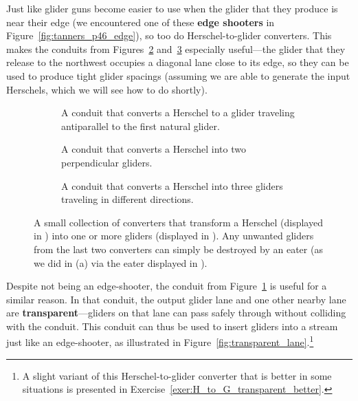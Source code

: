 Just like glider guns become easier to use when the glider that they produce is near their edge (we encountered one of these \textbf{edge shooters} in Figure~\ref{fig:tanners_p46_edge}), so too do Herschel-to-glider converters. This makes the conduits from Figures~\ref{fig:H_to_2G} and~\ref{fig:H_to_3G} especially useful---the glider that they release to the northwest occupies a diagonal lane close to its edge, so they can be used to produce tight glider spacings (assuming we are able to generate the input Herschels, which we will see how to do shortly).

\begin{figure}[!htb]
	\centering
	\begin{subfigure}{.315\textwidth}
		\centering\vspace*{1.23cm}
		\caption{A conduit that converts a Herschel to a glider traveling antiparallel to the first natural glider.}
		\label{fig:H_to_G}
	\end{subfigure} \hfill %
	\begin{subfigure}{.315\textwidth}
		\centering{}
		\caption{A conduit that converts a Herschel into two perpendicular gliders.}
		\label{fig:H_to_2G}
	\end{subfigure} \hfill %
	\begin{subfigure}{.315\textwidth}
		\centering{}
		\caption{A conduit that converts a Herschel into three gliders traveling in different directions.}
		\label{fig:H_to_3G}
	\end{subfigure}
	\caption{A small collection of converters that transform a Herschel (displayed in ) into one or more gliders (displayed in ). Any unwanted gliders from the last two converters can simply be destroyed by an eater (as we did in (a) via the eater displayed in ).}\label{fig:herschel_to_glider}
\end{figure}

Despite not being an edge-shooter, the conduit from Figure~\ref{fig:H_to_G} is useful for a similar reason. In that conduit, the output glider lane and one other nearby lane are \textbf{transparent}---gliders on that lane can pass safely through without colliding with the conduit. This conduit can thus be used to insert gliders into a stream just like an edge-shooter, as illustrated in Figure~\ref{fig:transparent_lane}.\footnote{A slight variant of this Herschel-to-glider converter that is better in some situations is presented in Exercise~\ref{exer:H_to_G_transparent_better}.}

